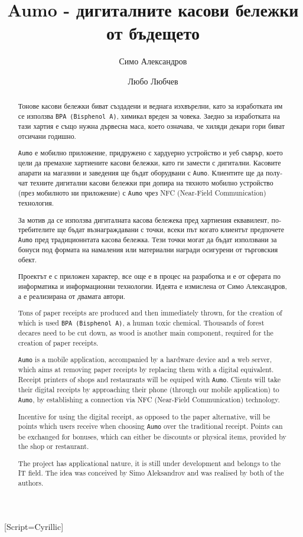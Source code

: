 \documentclass[
]{article}
\title{Aumo - дигиталните касови бележки от бъдещето}
\author{Симо Александров \and Любо Любчев}
\date{}
\begin{document}
\maketitle
\begin{abstract}
Тонове касови бележки биват създадени и веднага изхвърелни, като за
изработката им се използва \texttt{BPA\ (Bisphenol\ A)}, химикал вреден
за човека. Заедно за изработката на тази хартия е също нужна дървесна
маса, което означава, че хиляди декари гори биват отсичани годишно.

\texttt{Aumo} е мобилно приложение, придружено с хардуерно устройство и
уеб съврър, което цели да премахне хартиените касови бележки, като ги
замести с дигитални. Касовите апарати на магазини и заведения ще бъдат
оборудвани с \texttt{Aumo}. Клиентите ще да получат техните дигитални
касови бележки при допира на тяхното мобилно устройство (през мобилното
ни приложение) с \texttt{Aumo} чрез NFC (Near-Field Communication)
технология.

За мотив да се използва дигиталната касова бележека пред хартиения
еквавилент, потребителите ще бъдат възнаграждавани с точки, всеки път
когато клиентът предпочете \texttt{Aumo} пред традиционнтата касова
бележка. Тези точки могат да бъдат използвани за бонуси под формата на
намаления или материални награди осигурени от търговския обект.

Проектът е с приложен характер, все още е в процес на разработка и е от
сферата по информатика и информационни технологии. Идеята е измислена от
Симо Александров, а е реализирана от двамата автори.

Tons of paper receipts are produced and then immediately thrown, for the
creation of which is used \texttt{BPA\ (Bisphenol\ A)}, a human toxic
chemical. Thousands of forest decares need to be cut down, as wood is
another main component, required for the creation of paper receipts.

\texttt{Aumo} is a mobile application, accompanied by a hardware device
and a web server, which aims at removing paper receipts by replacing
them with a digital equivalent. Receipt printers of shops and
restaurants will be equiped with \texttt{Aumo}. Clients will take their
digital receipts by approaching their phone (through our mobile
application) to \texttt{Aumo}, by establishing a connection via NFC
(Near-Field Communication) technology.

Incentive for using the digital receipt, as opposed to the paper
alternative, will be points which users receive when choosing
\texttt{Aumo} over the traditional receipt. Points can be exchanged for
bonuses, which can either be discounts or physical items, provided by
the shop or restaurant.

The project has applicational nature, it is still under development and
belongs to the IT ﬁeld. The idea was conceived by Simo Aleksandrov and
was realised by both of the authors.
\end{abstract}

\setdefaultlanguage{russian}
\setmainfont[Ligatures=TeX]{Times New Roman}
\newfontfamily{}[Script=Cyrillic]
\end{document}
